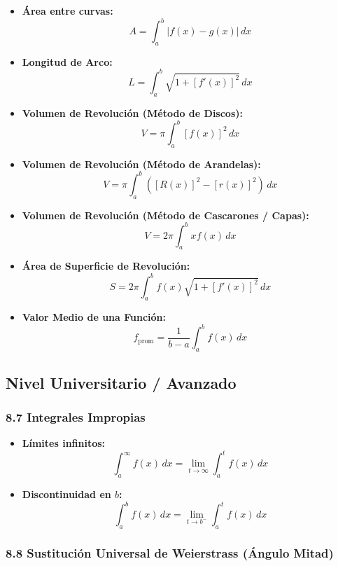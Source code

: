 \documentclass[11pt,a4paper]{article}
\begin{document}
\begin{itemize}
  \item \textbf{Área entre curvas:}
  \[
    A = \int_a^b |f(x) - g(x)| \, dx
  \]
  \item \textbf{Longitud de Arco:}
  \[
    L = \int_a^b \sqrt{1 + [f'(x)]^2} \, dx
  \]
  \item \textbf{Volumen de Revolución (Método de Discos):}
  \[
    V = \pi \int_a^b [f(x)]^2 \, dx
  \]
  \item \textbf{Volumen de Revolución (Método de Arandelas):}
  \[
    V = \pi \int_a^b ([R(x)]^2 - [r(x)]^2) \, dx
  \]
  \item \textbf{Volumen de Revolución (Método de Cascarones / Capas):}
  \[
    V = 2\pi \int_a^b x f(x) \, dx
  \]
  \item \textbf{Área de Superficie de Revolución:}
  \[
    S = 2\pi \int_a^b f(x) \sqrt{1 + [f'(x)]^2} \, dx
  \]
  \item \textbf{Valor Medio de una Función:}
  \[
    f_{\text{prom}} = \frac{1}{b - a} \int_a^b f(x) \, dx
  \]
\end{itemize}

\subsection*{Nivel Universitario / Avanzado}

\subsubsection*{8.7 Integrales Impropias}

\begin{itemize}
  \item \textbf{Límites infinitos:}
  \[
    \int_a^\infty f(x) \, dx = \lim_{t \to \infty} \int_a^t f(x) \, dx
  \]
  \item \textbf{Discontinuidad en $b$:}
  \[
    \int_a^b f(x) \, dx = \lim_{t \to b^-} \int_a^t f(x) \, dx
  \]
\end{itemize}

\subsubsection*{8.8 Sustitución Universal de Weierstrass (Ángulo Mitad)}
\end{document}
